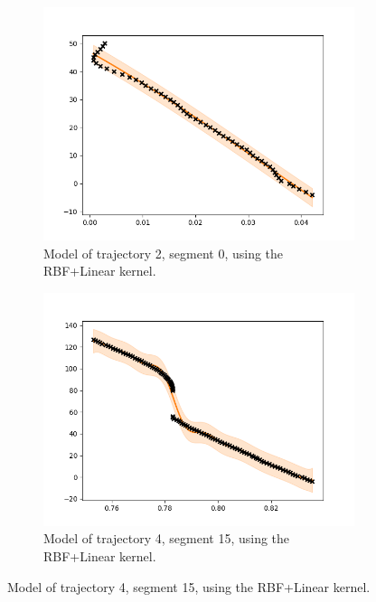 \begin{figure}
    \centering
    \begin{subfigure}[b]{0.475\textwidth}
        \centering
        \includegraphics[width=\textwidth]{figures/forecasting/gp_2_0_rbf_linear}
        \caption[]%
        {{\small Model of trajectory 2, segment 0, using the RBF+Linear kernel.}}    
        \label{fig:2-0-rbf-linear}
    \end{subfigure}
    \hfill
    \begin{subfigure}[b]{0.475\textwidth}  
        \centering 
        \includegraphics[width=\textwidth]{figures/forecasting/gp_4_15_rbf_linear}
        \caption[]%
        {{\small Model of trajectory 4, segment 15, using the RBF+Linear kernel.}}    

\end{subfigure}
\end{figure}
